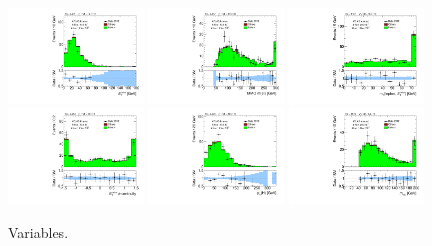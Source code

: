 \begin{figure}[tp]
  \includegraphics[width=0.32\textwidth]{figures/analysis/vbf-ZllCR/met-pt-hi}
  \includegraphics[width=0.32\textwidth]{figures/analysis/vbf-ZllCR/mMMC}
  \includegraphics[width=0.32\textwidth]{figures/analysis/vbf-ZllCR/mT}
  \includegraphics[width=0.32\textwidth]{figures/analysis/vbf-ZllCR/met-phi-centrality}
  \includegraphics[width=0.32\textwidth]{figures/analysis/vbf-ZllCR/H-pt-hi}
  \includegraphics[width=0.32\textwidth]{figures/analysis/vbf-ZllCR/mvis}
  \caption{Variables.}
  \label{fig:backgrounds-ZllCR-taus}
\end{figure}

